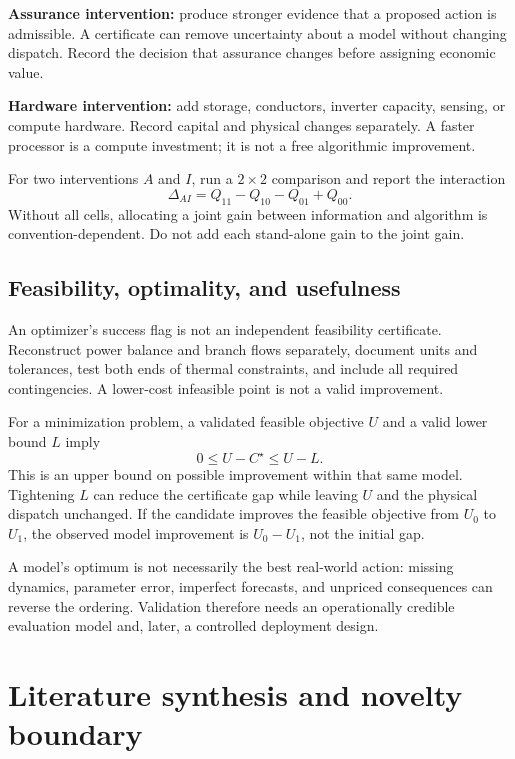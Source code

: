 \documentclass[11pt,letterpaper]{article}
\begin{document}
\textbf{Assurance intervention:} produce stronger evidence that a proposed action is admissible. A certificate can remove uncertainty about a model without changing dispatch. Record the decision that assurance changes before assigning economic value.

\textbf{Hardware intervention:} add storage, conductors, inverter capacity, sensing, or compute hardware. Record capital and physical changes separately. A faster processor is a compute investment; it is not a free algorithmic improvement.

For two interventions $A$ and $I$, run a $2\times2$ comparison and report the interaction
\[
 \Delta_{AI}=Q_{11}-Q_{10}-Q_{01}+Q_{00}.
\]
Without all cells, allocating a joint gain between information and algorithm is convention-dependent. Do not add each stand-alone gain to the joint gain.

\subsection{Feasibility, optimality, and usefulness}
An optimizer's success flag is not an independent feasibility certificate. Reconstruct power balance and branch flows separately, document units and tolerances, test both ends of thermal constraints, and include all required contingencies. A lower-cost infeasible point is not a valid improvement.

For a minimization problem, a validated feasible objective $U$ and a valid lower bound $L$ imply
\begin{equation}
 0\le U-C^\star\le U-L.
 \label{eq:gap}
\end{equation}
This is an upper bound on possible improvement within that same model. Tightening $L$ can reduce the certificate gap while leaving $U$ and the physical dispatch unchanged. If the candidate improves the feasible objective from $U_0$ to $U_1$, the observed model improvement is $U_0-U_1$, not the initial gap.

A model's optimum is not necessarily the best real-world action: missing dynamics, parameter error, imperfect forecasts, and unpriced consequences can reverse the ordering. Validation therefore needs an operationally credible evaluation model and, later, a controlled deployment design.

\section{Literature synthesis and novelty boundary}
\label{sec:literature}
\end{document}

